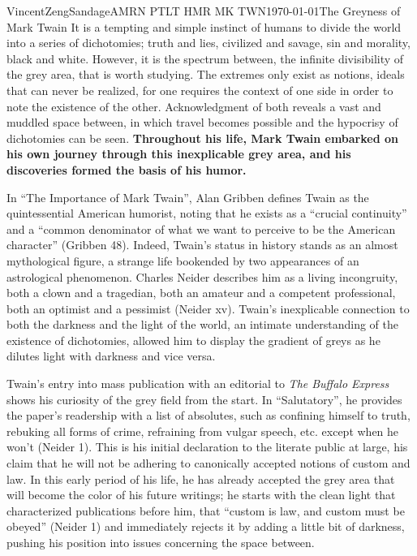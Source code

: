 \documentclass{article}[12pt]
\begin{document}
\begin{mla}{Vincent}{Zeng}{Sandage}{AMRN PTLT HMR MK TWN}{\today}{The Greyness of Mark Twain}
It is a tempting and simple instinct of humans to divide the world into a series of dichotomies; truth and lies, civilized and savage, sin and morality, black and white. However, it is the spectrum between, the infinite divisibility of the grey area, that is worth studying. The extremes only exist as notions, ideals that can never be realized, for one requires the context of one side in order to note the existence of the other. Acknowledgment of both reveals a vast and muddled space between, in which travel becomes possible and the hypocrisy of dichotomies can be seen. \textbf{Throughout his life, Mark Twain embarked on his own journey through this inexplicable grey area, and his discoveries formed the basis of his humor.}

In ``The Importance of Mark Twain'', Alan Gribben defines Twain as the quintessential American humorist, noting that he exists as a ``crucial continuity'' and a ``common denominator of what we want to perceive to be the American character'' (Gribben 48). Indeed, Twain's status in history stands as an almost mythological figure, a strange life bookended by two appearances of an astrological phenomenon. Charles Neider describes him as a living incongruity, both a clown and a tragedian, both an amateur and a competent professional, both an optimist and a pessimist (Neider xv). Twain's inexplicable connection to both the darkness and the light of the world, an intimate understanding of the existence of dichotomies, allowed him to display the gradient of greys as he dilutes light with darkness and vice versa.

Twain's entry into mass publication with an editorial to \textit{The Buffalo Express} shows his curiosity of the grey field from the start. In ``Salutatory'', he provides the paper's readership with a list of absolutes, such as confining himself to truth, rebuking all forms of crime, refraining from vulgar speech, etc. except when he won't (Neider 1). This is his initial declaration to the literate public at large, his claim that he will not be adhering to canonically accepted notions of custom and  law. In this early period of his life, he has already accepted the grey area that will become the color of his future writings; he starts with the clean light that characterized publications before him, that ``custom is law, and custom must be obeyed'' (Neider 1) and immediately rejects it by adding a little bit of darkness, pushing his position into issues concerning the space between.


\end{mla}
\end{document}
